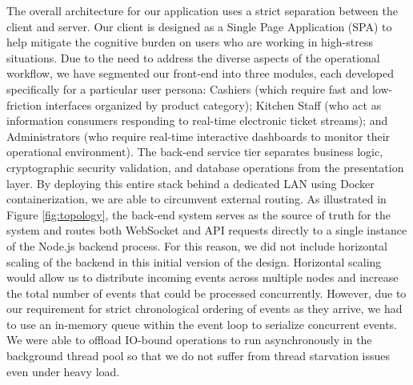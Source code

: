 \documentclass[conference]{IEEEtran}
\begin{document}
The overall architecture for our application uses a strict separation between the client and server. Our client is designed as a Single Page Application (SPA) to help mitigate the cognitive burden on users who are working in high-stress situations. Due to the need to address the diverse aspects of the operational workflow, we have segmented our front-end into three modules, each developed specifically for a particular user persona: Cashiers (which require fast and low-friction interfaces organized by product category); Kitchen Staff (who act as information consumers responding to real-time electronic ticket streams); and Administrators (who require real-time interactive dashboards to monitor their operational environment). The back-end service tier separates business logic, cryptographic security validation, and database operations from the presentation layer. By deploying this entire stack behind a dedicated LAN using Docker containerization, we are able to circumvent external routing. As illustrated in Figure \ref{fig:topology}, the back-end system serves as the source of truth for the system and routes both WebSocket and API requests directly to a single instance of the Node.js backend process. For this reason, we did not include horizontal scaling of the backend in this initial version of the design. Horizontal scaling would allow us to distribute incoming events across multiple nodes and increase the total number of events that could be processed concurrently. However, due to our requirement for strict chronological ordering of events as they arrive, we had to use an in-memory queue within the event loop to serialize concurrent events. We were able to offload IO-bound operations to run asynchronously in the background thread pool so that we do not suffer from thread starvation issues even under heavy load.
\end{document}
